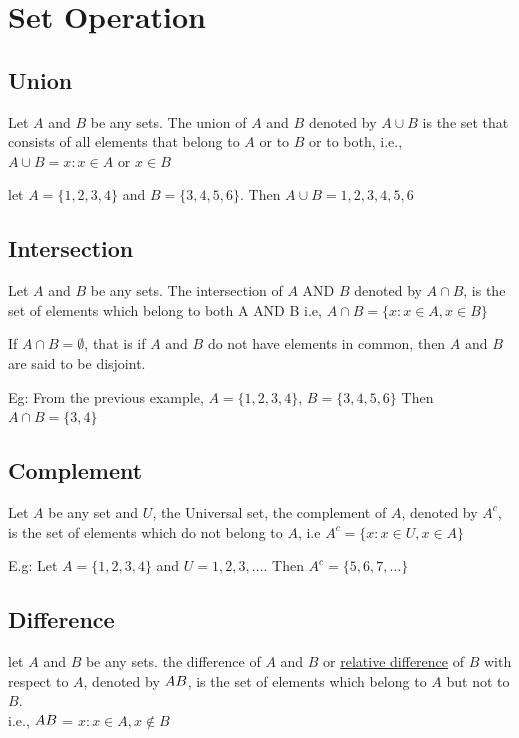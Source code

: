 \section{Set Operation}
\subsection{Union}
\begin{para}
    Let $A$ and $B$ be any sets. The union of $A$ and $B$ denoted by $A \cup B$ is the set that consists of all elements that belong to $A$ or to $B$ or to both, i.e., $A \cup B = {x:x \in A \text{ or } x \in B}$
\end{para}
\begin{para}
    let $A = \{1,2,3,4\}$ and $B = \{3,4,5,6\}$. Then $A \cup B = {1,2,3,4,5,6}$
\end{para}
\subsection{Intersection}
\begin{para}
    Let $A$ and $B$ be any sets. The intersection of $A$ AND $B$ denoted by $A \cap B$, is the set of elements which belong to both A AND B i.e, $A \cap B = \{x:x \in A, x \in B\}$
\end{para}

\begin{para}
    If $A \cap B = \emptyset$, that is if $A$ and $B$ do not have elements in common, then $A$ and $B$ are said to be disjoint.
\end{para}

\begin{para}
    Eg: From the previous example, $A = \{1,2,3,4\}$, $B = \{3,4,5,6\}$ Then $A \cap B = \{3,4\}$
\end{para}

\subsection{Complement}
\begin{para}
    Let $A$ be any set and $U$, the Universal set, the complement of $A$, denoted by $A^c$, is the set of elements which do not belong to $A$, i.e $A^c = \{x:x \in U, x \in A\}$

    E.g: Let $A = \{1,2,3,4\}$ and $U = {1,2,3, \dots}$. Then $A^c = \{5,6,7,\dots\}$
\end{para}

\subsection{Difference}
\begin{para}
    let $A$ and $B$ be any sets. the difference of $A$ and $B$ or \underline{relative difference} of $B$ with respect to $A$, denoted by $A\text{\\}B$, is the set of elements which belong to $A$ but not to $B$.\\
    i.e., $A\text{\\}B$ = $x:x \in A, x \notin B$
\end{para}


